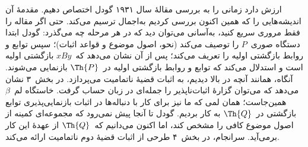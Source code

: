\documentclass[../../../include/open-logic-section]{subfiles}
\begin{document}


ارزش دارد زمانی را به بررسی مقالهٔ سال ۱۹۳۱ گودل اختصاص دهیم. مقدمهٔ
آن اندیشه‌هایی را که همین اکنون بررسی کردیم به‌اجمال ترسیم می‌کند. حتی
اگر مقاله را فقط مروری سریع کنید، به‌آسانی می‌توان دید که در هر مرحله
چه می‌گذرد: گودل ابتدا دستگاه صوری~$P$ را توصیف می‌کند (نحو، اصول
موضوع و قواعد اثبات)؛ سپس توابع و روابط بازگشتی اولیه را تعریف می‌کند؛
پس از آن نشان می‌دهد که~$x B y$ بازگشتی اولیه است و استدلال می‌کند که
توابع و روابط بازگشتی اولیه در~$\Th{P}$ بازنمایی می‌شوند. آنگاه، همانند
آنچه در بالا دیدیم، به اثبات قضیهٔ ناتمامیت می‌پردازد. در بخش~۳ نشان
می‌دهد که می‌توان گزارهٔ اثبات‌ناپذیر را جمله‌ای در زبان حساب گرفت. خاستگاه
لم~$\beta$ همین‌جاست؛ همان لمی که ما نیز برای کار با دنباله‌ها در اثبات
بازنمایی‌پذیری توابع بازگشتی در~$\Th{Q}$ به کار بردیم. گودل تا آنجا
پیش نمی‌رود که مجموعه‌ای کمینه از اصول موضوع کافی را مشخص کند، اما اکنون
می‌دانیم که~$\Th{Q}$ از عهدهٔ این کار برمی‌آید. سرانجام، در بخش~۴
طرحی از اثبات قضیهٔ دوم ناتمامیت ارائه می‌کند.
\end{document}
